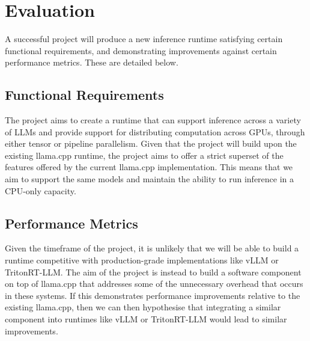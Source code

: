 \documentclass[12pt,twoside]{report}
\begin{document}
\begin{comment}
\chapter{Project Plan} %
\begin{itemize}
  \item \textbf{Confirming project direction (three weeks):} At present, it seems likely that we will try and improve the state of existing LLM runtimes by building upon llama.cpp 
  \item \textbf{:}
  \item \textbf{Evaluation (two weeks):} 
  \item \textbf{Project report (three weeks):} 
\end{itemize}
\end{comment}


\chapter{Evaluation} %
A successful project will produce a new inference runtime satisfying certain functional requirements, and demonstrating improvements against certain performance metrics.  
These are detailed below.

\section{Functional Requirements}
The project aims to create a runtime that can support inference across a variety of LLMs and provide support for distributing computation across GPUs, through either tensor or pipeline parallelism.
Given that the project will build upon the existing llama.cpp runtime, the project aims to offer a strict superset of the features offered by the current llama.cpp implementation.
This means that we aim to support the same models and maintain the ability to run inference in a CPU-only capacity. 

\section{Performance Metrics}
Given the timeframe of the project, it is unlikely that we will be able to build a runtime competitive with production-grade implementations like vLLM or TritonRT-LLM.
The aim of the project is instead to build a software component on top of llama.cpp that addresses some of the unnecessary overhead that occurs in these systems.
If this demonstrates performance improvements relative to the existing llama.cpp, then we can then hypothesise that integrating a similar component into runtimes like vLLM or TritonRT-LLM would lead to similar improvements.
\end{document}
